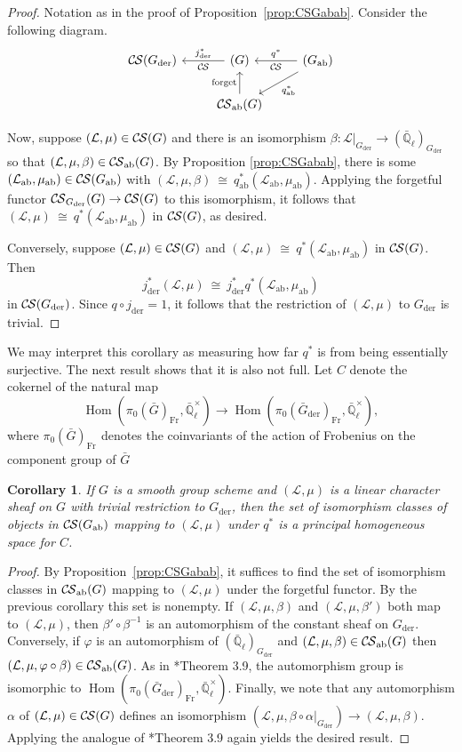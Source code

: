 \documentclass[10pt]{amsart}
\theoremstyle{plain}
\newtheorem{corollary}[theorem]{Corollary}
\theoremstyle{definition}
\newcommand{\EE}{\mathbb{\bar Q}_\ell}
\newcommand{\EEx}{\EE^\times}
\newcommand{\Frob}[1]{\operatorname{Fr}_{#1}}
\DeclareMathOperator{\Hom}{Hom}
\newcommand{\der}{_{\operatorname{der}}}
\newcommand{\ab}{_{\operatorname{ab}}}
\newcommand{\iso}{{\ \cong\ }}
\newcommand{\cs}[1]{{\mathcal{#1}}}
\newcommand{\CS}{{\mathcal{C\hskip-0.8pt S}}}
\begin{document}
\begin{proof}
Notation as in the proof of Proposition~\ref{prop:CSGabab}.
Consider the following diagram.
\[
\begin{tikzcd}
\CS(G\der) & \arrow{l}[swap]{j\der^*} \CS(G) &\arrow{l}[swap]{q^*} 
\CS(G\ab) \arrow{dl}{q\ab^*} \\
& \CS\ab(G) \arrow{u}{\text{forget}}  & 
\end{tikzcd}
\]

Now, suppose $(\cs{L},\mu)\in \CS(G)$ and there is an isomorphism $\beta : \cs{L}\vert_{G\der} \to (\EE)_{G\der}$ so that
$(\cs{L},\mu,\beta) \in \CS\ab(G)$.
By Proposition \ref{prop:CSGabab}, there is some $(\cs{L}\ab,\mu\ab)\in \CS(G\ab)$ with $(\cs{L},\mu,\beta) \iso q\ab^*(\cs{L}\ab,\mu\ab)$.
Applying the forgetful functor $\CS_{G\der}(G)\to \CS(G)$ to this isomorphism, it follows that $(\cs{L},\mu) \iso q^*(\cs{L}\ab,\mu\ab)$ in $\CS(G)$, as desired. 

Conversely, suppose $(\cs{L},\mu)\in \CS(G)$ and $(\cs{L},\mu) \iso q^*(\cs{L}\ab,\mu\ab)$ in $\CS(G)$.
Then 
\[
j\der^*(\cs{L},\mu) \iso j\der^*q^*(\cs{L}\ab,\mu\ab)
\]
 in $\CS(G\der)$.
Since $q\circ j\der = 1$, it follows that the restriction of $(\cs{L},\mu)$ to $G\der$ is trivial.
\end{proof}

We may interpret this corollary as measuring how far $q^*$ is from being essentially surjective.  The next result shows that it is also not full.
Let $C$ denote the cokernel of the natural map
\[
\Hom(\pi_0(\bar{G})_{\Frob{}}, \EEx) \to \Hom(\pi_0(\bar{G}\der)_{\Frob{}}, \EEx),
\]
where $\pi_0(\bar{G})_{\Frob{}}$ denotes the coinvariants of the action of Frobenius on
the component group of $\bar{G}$

\begin{corollary}
If $G$ is a smooth group scheme and $(\cs{L},\mu)$ is a linear character sheaf on $G$ with trivial restriction to $G\der$,
then the set of isomorphism classes of objects in $\CS(G\ab)$ mapping to $(\cs{L},\mu)$ under $q^*$ is a principal homogeneous space
for $C$.
\end{corollary}
\begin{proof}
By Proposition~\ref{prop:CSGabab}, it suffices to find the set of isomorphism classes in $\CS\ab(G)$ mapping to
$(\cs{L},\mu)$ under the forgetful functor.  By the previous corollary this set is nonempty.
If $(\cs{L},\mu,\beta)$ and $(\cs{L},\mu,\beta')$ both map to $(\cs{L},\mu)$, then $\beta' \circ \beta^{-1}$ is an
automorphism of the constant sheaf on $G\der$.  Conversely, if $\varphi$ is an automorphism of $(\EE)_{G\der}$
and $(\cs{L},\mu,\beta) \in \CS\ab(G)$ then $(\cs{L},\mu,\varphi \circ \beta) \in \CS\ab(G)$.  As in \cite{cunningham-roe:13a}*{Theorem 3.9},
the automorphism group is isomorphic to $\Hom(\pi_0(\bar{G}\der)_{\Frob{}}, \EEx)$.  Finally, we note that any
automorphism $\alpha$ of $(\cs{L},\mu) \in \CS(G)$ defines an isomorphism $(\cs{L},\mu,\beta \circ \alpha|_{G\der}) \to (\cs{L},\mu,\beta)$.
Applying the analogue of \cite{cunningham-roe:13a}*{Theorem 3.9} again yields the desired result.
\end{proof}
\end{document}
